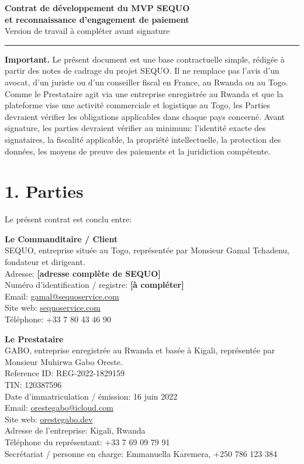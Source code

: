 \documentclass[11pt,a4paper]{article}
\newcommand{\champ}[1]{\textbf{[#1]}}
\newcommand{\separateur}{\vspace{0.8em}\hrule\vspace{1em}}
\begin{document}
\begin{center}
    {\Large \textbf{Contrat de développement du MVP SEQUO}}\\[0.35em]
    {\large \textbf{et reconnaissance d'engagement de paiement}}\\[0.8em]
    Version de travail à compléter avant signature
\end{center}

\separateur

\textbf{Important.} Le présent document est une base contractuelle simple, rédigée à partir des notes de cadrage du projet SEQUO. Il ne remplace pas l'avis d'un avocat, d'un juriste ou d'un conseiller fiscal en France, au Rwanda ou au Togo. Comme le Prestataire agit via une entreprise enregistrée au Rwanda et que la plateforme vise une activité commerciale et logistique au Togo, les Parties devraient vérifier les obligations applicables dans chaque pays concerné. Avant signature, les parties devraient vérifier au minimum: l'identité exacte des signataires, la fiscalité applicable, la propriété intellectuelle, la protection des données, les moyens de preuve des paiements et la juridiction compétente.

\section*{1. Parties}

Le présent contrat est conclu entre:

\textbf{Le Commanditaire / Client}\\
SEQUO, entreprise située au Togo, représentée par Monsieur Gamal Tchadenu, fondateur et dirigeant.\\
Adresse: \champ{adresse complète de SEQUO}\\
Numéro d'identification / registre: \champ{à compléter}\\
Email: \href{mailto:gamal@sequoservice.com}{gamal@sequoservice.com}\\
Site web: \href{https://sequoservice.com}{sequoservice.com}\\
Téléphone: +33 7 80 43 46 90

\textbf{Le Prestataire}\\
GABO, entreprise enregistrée au Rwanda et basée à Kigali, représentée par Monsieur Muhirwa Gabo Oreste.\\
Reference ID: REG-2022-1829159\\
TIN: 120387596\\
Date d'immatriculation / émission: 16 juin 2022\\
Email: \href{mailto:orestegabo@icloud.com}{orestegabo@icloud.com}\\
Site web: \href{https://orestegabo.dev}{orestegabo.dev}\\
Adresse de l'entreprise: Kigali, Rwanda\\
Téléphone du représentant: +33 7 69 09 79 91\\
Secrétariat / personne en charge: Emmanuella Karemera, +250 786 123 384
\end{document}
